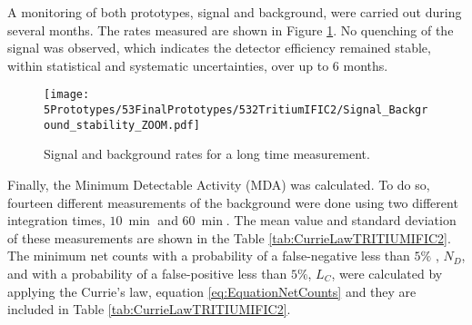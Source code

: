 


A monitoring of both prototypes, signal and background, were carried out during several months. The rates measured are shown in Figure \ref{fig:MonitorizationTRITIUMIFIC2}. No quenching of the signal was observed, which indicates the detector efficiency remained stable, within statistical and systematic uncertainties, over up to 6 months. 

\begin{figure}[h]
\centering
\texttt{[image: 5Prototypes/53FinalPrototypes/532TritiumIFIC2/Signal\_Background\_stability\_ZOOM.pdf]}
\caption{Signal and background rates for a long time measurement.\label{fig:MonitorizationTRITIUMIFIC2}}
\end{figure}

Finally, the Minimum Detectable Activity (MDA) was calculated. To do so, fourteen different measurements of the background were done using two different integration times, $10~\min$ and $60~\min$. The mean value and standard deviation of these measurements are shown in the Table \ref{tab:CurrieLawTRITIUMIFIC2}. The minimum net counts with a probability of a  false-negative less than $5\%$ , $N_D$, and with a probability of a false-positive less than $5\%$, $L_C$, were calculated by applying the Currie's law, equation \ref{eq:EquationNetCounts} and they are included in Table \ref{tab:CurrieLawTRITIUMIFIC2}.

